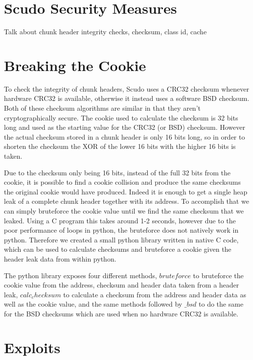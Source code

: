 \documentclass[a4paper,11pt,oneside]{report}
\begin{document}
\chapter{Scudo Security Measures}

Talk about chunk header integrity checks, checksum, class id, cache

\chapter{Breaking the Cookie}

To check the integrity of chunk headers, Scudo uses a CRC32 checksum
whenever hardware CRC32 is available, otherwise it instead uses a software
BSD checksum. Both of these checksum algorithms are similar in that they
aren't cryptographically secure. The cookie used to calculate the checksum
is 32 bits long and used as the starting value for the CRC32 (or BSD) checksum.
However the actual checksum stored in a chunk header is only 16 bits long, so
in order to shorten the checksum the XOR of the lower 16 bits with the higher
16 bits is taken.

Due to the checksum only being 16 bits, instead of the full 32 bits from the
cookie, it is possible to find a cookie collision and produce the same checksums
the original cookie would have produced. Indeed it is enough to get a single
heap leak of a complete chunk header together with its address. To accomplish
that we can simply bruteforce the cookie value until we find the same checksum
that we leaked. Using a C program this takes around 1-2 seconds, however due to
the poor performance of loops in python, the bruteforce does not natively work
in python. Therefore we created a small python library written in native C code,
which can be used to calculate checksums and bruteforce a cookie given the header
leak data from within python.

The python library exposes four different methods, $bruteforce$ to bruteforce
the cookie value from the address, checksum and header data taken from a header leak,
$calc_checksum$ to calculate a checksum from the address and header data as well
as the cookie value, and the same methods followed by $\_bsd$ to do the same
for the BSD checksums which are used when no hardware CRC32 is available.


\chapter{Exploits}
\end{document}

